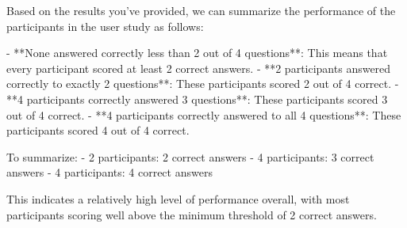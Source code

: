 Based on the results you've provided, we can summarize the performance of the participants in the user study as follows:

- **None answered correctly less than 2 out of 4 questions**: This means that every participant scored at least 2 correct answers.
- **2 participants answered correctly to exactly 2 questions**: These participants scored 2 out of 4 correct.
- **4 participants correctly answered 3 questions**: These participants scored 3 out of 4 correct.
- **4 participants correctly answered to all 4 questions**: These participants scored 4 out of 4 correct.

To summarize:
- 2 participants: 2 correct answers
- 4 participants: 3 correct answers
- 4 participants: 4 correct answers

This indicates a relatively high level of performance overall, with most participants scoring well above the minimum threshold of 2 correct answers.